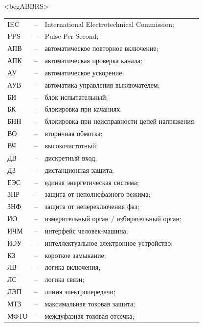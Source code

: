 \color{unimain}\section*{}
{\color{white}\fontsize{0.1pt}{0.1pt}\selectfont<begABBRS>}
\color{black}
\begin{longtable}{>{\raggedright\arraybackslash}m{2cm}>{\raggedright\arraybackslash}m{0.5cm}>{\raggedright\arraybackslash}m{20cm}}
\endfirsthead\endhead\endfoot\endlastfoot
IEC & -- &  International Electrotechnical Commission; \\
PPS & -- & Pulse Per Second; \\
АПВ & -- & автоматическое повторное включение; \\
АПК & -- & автоматическая проверка канала; \\
АУ & -- & автоматическое ускорение; \\
АУВ & -- & автоматика управления выключателем; \\
БИ & -- & блок испытательный; \\
БК & -- & блокировка при качаниях; \\
БНН & -- & блокировка при неисправности цепей напряжения; \\
ВО & -- & вторичная обмотка; \\
ВЧ & -- & высокочастотный; \\
ДВ & -- & дискретный вход; \\
ДЗ & -- & дистанционная защита; \\
ЕЭС & -- & единая энергетическая система; \\
ЗНР & -- & защита от неполнофазного режима; \\
ЗНФ & -- & защита от непереключения фаз; \\
ИО & -- & измерительный орган / избирательный орган; \\
ИЧМ & -- & интерфейс человек-машина; \\
ИЭУ & -- & интеллектуальное электронное устройство; \\
КЗ & -- & короткое замыкание; \\
ЛВ & -- & логика включения; \\
ЛС & -- & логика связи; \\
ЛЭП & -- & линия электропередачи; \\
МТЗ & -- & максимальная токовая защита; \\
МФТО & -- & междуфазная токовая отсечка; \\

\end{longtable}

